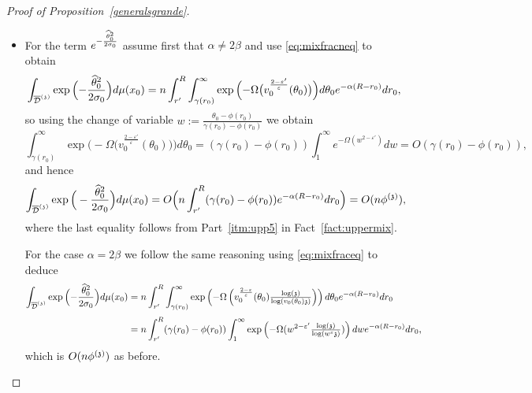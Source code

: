 \begin{proof}[Proof of Proposition~\ref{generalsgrande}]
\medskip
\begin{itemize}\setlength\itemsep{1ex}
    \item 
    For the term $e^{-\frac{\widehat{\theta}_0^2}{2\sigma_0}}$ assume first that $\alpha\neq2\beta$ and use \eqref{eq:mixfracneq} to obtain %
\[\int_{\overline{\mathcal{D}}^{(\mathfrak{z})}}\exp\Big({-}\frac{\widehat{\theta}_0^2}{2\sigma_0}\Big)d\mu(x_0)=n\int_{r'}^R\int_{\gamma(r_0)}^\infty \exp\Big({-}\Omega\big(v_0^{\frac{2-\varepsilon'}{\varepsilon}}(\theta_0)\big)\Big)d\theta_0 e^{-\alpha(R-r_0)}dr_0,\]
so using the change of variable $w:=\frac{\theta_0-\phi(r_0)}{\gamma(r_0)-\phi(r_0)}$ we obtain 
\[\int_{\gamma(r_0)}^\infty \exp\Big({-}\Omega\big(v_0^{\frac{2-\varepsilon'}{\varepsilon}}(\theta_0)\big)\Big)d\theta_0=(\gamma(r_0)-\phi(r_0))\int_{1}^\infty e^{-\Omega(w^{2-\varepsilon'})}dw=O(\gamma(r_0)-\phi(r_0)),\]
and hence
\[\int_{\overline{\mathcal{D}}^{(\mathfrak{z})}}\exp\Big(-\frac{\widehat{\theta}_0^2}{2\sigma_0}\Big)d\mu(x_0)=O\Big(n\int_{r'}^R(\gamma(r_0)-\phi(r_0))e^{-\alpha(R-r_0)}dr_0\Big)=O(n\phi^{(\mathfrak{z})}),\]
where the last equality follows from Part~\eqref{itm:upp5} in Fact~\ref{fact:uppermix}.

\medskip

For the case $\alpha=2\beta$ we follow the same reasoning using \eqref{eq:mixfraceq} to deduce
\begin{align*}\int_{\overline{\mathcal{D}}^{(\mathfrak{z})}}\exp\Big({-}\frac{\widehat{\theta}_0^2}{2\sigma_0}\Big)d\mu(x_0)&=n\int_{r'}^R\int_{\gamma(r_0)}^\infty \exp\left(-\Omega\left(v_0^{\frac{2-\varepsilon}{\varepsilon}}(\theta_0)\tfrac{\log(\mathfrak{z})}{\log(v_0(\theta_0)\mathfrak{z})}\right)\right)d\theta_0 e^{-\alpha(R-r_0)}dr_0\\[3pt]&=n\int_{r'}^R(\gamma(r_0)-\phi(r_0))\int_{1}^\infty \exp\left(-\Omega(w^{2-\varepsilon'}\tfrac{\log(\mathfrak{z})}{\log(w^{\varepsilon}\mathfrak{z})})\right)dwe^{-\alpha(R-r_0)}dr_0,\end{align*}
which is $O(n\phi^{(\mathfrak{z})})$ as before.


\end{itemize}
\end{proof}
